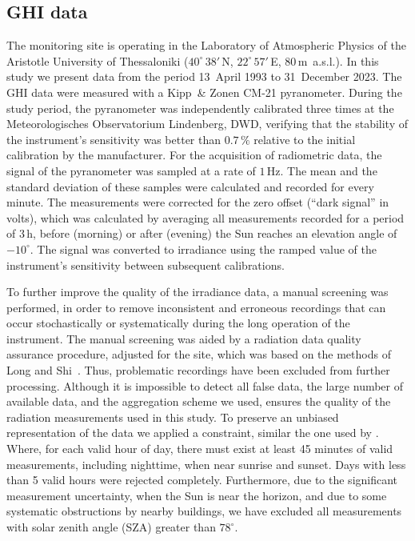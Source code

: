 \documentclass[preprint, 5p,
authoryear]{elsarticle} %
\begin{document}
\hypertarget{ghi-data}{%
\subsection{GHI data}\label{ghi-data}}

The monitoring site is operating in the Laboratory of Atmospheric
Physics of the Aristotle University of Thessaloniki
(\(40^\circ\,38'\,\)N, \(22^\circ\,57'\,\)E, \(80\,\)m~a.s.l.). In this
study we present data from the period 13~April 1993 to 31~December 2023.
The GHI data were measured with a Kipp~\& Zonen CM-21 pyranometer.
During the study period, the pyranometer was independently calibrated
three times at the Meteorologisches Observatorium Lindenberg, DWD,
verifying that the stability of the instrument's sensitivity was better
than \(0.7\,\%\) relative to the initial calibration by the
manufacturer. For the acquisition of radiometric data, the signal of the
pyranometer was sampled at a rate of \(1\,\text{Hz}\). The mean and the
standard deviation of these samples were calculated and recorded for
every minute. The measurements were corrected for the zero offset
(``dark signal'' in volts), which was calculated by averaging all
measurements recorded for a period of \(3\,\text{h}\), before (morning)
or after (evening) the Sun reaches an elevation angle of \(-10^\circ\).
The signal was converted to irradiance using the ramped value of the
instrument's sensitivity between subsequent calibrations.

To further improve the quality of the irradiance data, a manual
screening was performed, in order to remove inconsistent and erroneous
recordings that can occur stochastically or systematically during the
long operation of the instrument. The manual screening was aided by a
radiation data quality assurance procedure, adjusted for the site, which
was based on the methods of Long and Shi~\citep{Long2006, Long2008a}.
Thus, problematic recordings have been excluded from further processing.
Although it is impossible to detect all false data, the large number of
available data, and the aggregation scheme we used, ensures the quality
of the radiation measurements used in this study. To preserve an
unbiased representation of the data we applied a constraint, similar the
one used by \citet{CastillejoCuberos2020}. Where, for each valid hour of
day, there must exist at least 45 minutes of valid measurements,
including nighttime, when near sunrise and sunset. Days with less than 5
valid hours were rejected completely. Furthermore, due to the
significant measurement uncertainty, when the Sun is near the horizon,
and due to some systematic obstructions by nearby buildings, we have
excluded all measurements with solar zenith angle (SZA) greater than
\(78^\circ\).
\end{document}
